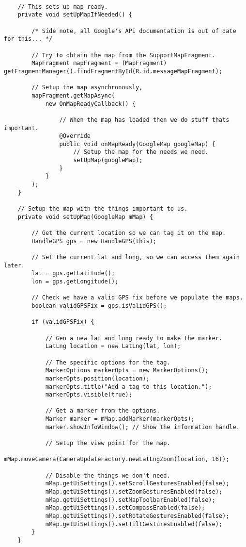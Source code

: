 \begin{lstlisting}

    // This sets up map ready.
    private void setUpMapIfNeeded() {

        /* Side note, all Google's API documentation is out of date for this... */

        // Try to obtain the map from the SupportMapFragment.
        MapFragment mapFragment = (MapFragment) getFragmentManager().findFragmentById(R.id.messageMapFragment);

        // Setup the map asynchronously,
        mapFragment.getMapAsync(
            new OnMapReadyCallback() {

                // When the map has loaded then we do stuff thats important.
                @Override
                public void onMapReady(GoogleMap googleMap) {
                    // Setup the map for the needs we need.
                    setUpMap(googleMap);
                }
            }
        );
    }

    // Setup the map with the things important to us.
    private void setUpMap(GoogleMap mMap) {

        // Get the current location so we can tag it on the map.
        HandleGPS gps = new HandleGPS(this);

        // Set the current lat and long, so we can access them again later.
        lat = gps.getLatitude();
        lon = gps.getLongitude();

        // Check we have a valid GPS fix before we populate the maps.
        boolean validGPSFix = gps.isValidGPS();

        if (validGPSFix) {

            // Gen a new lat and long ready to make the marker.
            LatLng location = new LatLng(lat, lon);

            // The specific options for the tag.
            MarkerOptions markerOpts = new MarkerOptions();
            markerOpts.position(location);
            markerOpts.title("Add a tag to this location.");
            markerOpts.visible(true);

            // Get a marker from the options.
            Marker marker = mMap.addMarker(markerOpts);
            marker.showInfoWindow(); // Show the information handle.

            // Setup the view point for the map.
            mMap.moveCamera(CameraUpdateFactory.newLatLngZoom(location, 16));

            // Disable the things we don't need.
            mMap.getUiSettings().setScrollGesturesEnabled(false);
            mMap.getUiSettings().setZoomGesturesEnabled(false);
            mMap.getUiSettings().setMapToolbarEnabled(false);
            mMap.getUiSettings().setCompassEnabled(false);
            mMap.getUiSettings().setRotateGesturesEnabled(false);
            mMap.getUiSettings().setTiltGesturesEnabled(false);
        }
    }
 
\end{lstlisting}


